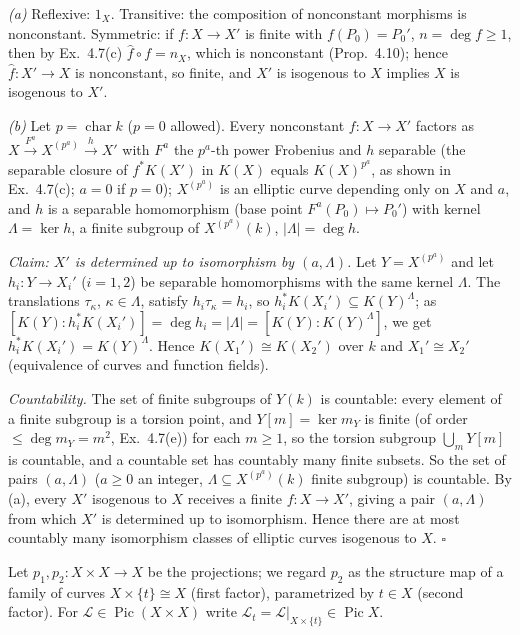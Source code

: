 \documentclass[11pt]{article}
\begin{document}
\emph{(a)} Reflexive: $1_X$. Transitive: the composition of nonconstant morphisms is nonconstant. Symmetric: if $f:X\to X'$ is finite with $f(P_0)=P_0'$, $n=\deg f\ge1$, then by Ex.~4.7(c) $\hat f\circ f=n_X$, which is nonconstant (Prop.~4.10); hence $\hat f:X'\to X$ is nonconstant, so finite, and $X'$ is isogenous to $X$ implies $X$ is isogenous to $X'$.

\emph{(b)} Let $p=\operatorname{char}k$ ($p=0$ allowed). Every nonconstant $f:X\to X'$ factors as $X\xrightarrow{F^a}X^{(p^a)}\xrightarrow{h}X'$ with $F^a$ the $p^a$-th power Frobenius and $h$ separable (the separable closure of $f^*K(X')$ in $K(X)$ equals $K(X)^{p^a}$, as shown in Ex.~4.7(c); $a=0$ if $p=0$); $X^{(p^a)}$ is an elliptic curve depending only on $X$ and $a$, and $h$ is a separable homomorphism (base point $F^a(P_0)\mapsto P_0'$) with kernel $\Lambda=\ker h$, a finite subgroup of $X^{(p^a)}(k)$, $|\Lambda|=\deg h$.

\emph{Claim: $X'$ is determined up to isomorphism by $(a,\Lambda)$.} Let $Y=X^{(p^a)}$ and let $h_i:Y\to X_i'$ ($i=1,2$) be separable homomorphisms with the same kernel $\Lambda$. The translations $\tau_\kappa$, $\kappa\in\Lambda$, satisfy $h_i\tau_\kappa=h_i$, so $h_i^*K(X_i')\subseteq K(Y)^\Lambda$; as $[K(Y):h_i^*K(X_i')]=\deg h_i=|\Lambda|=[K(Y):K(Y)^\Lambda]$, we get $h_i^*K(X_i')=K(Y)^\Lambda$. Hence $K(X_1')\cong K(X_2')$ over $k$ and $X_1'\cong X_2'$ (equivalence of curves and function fields).

\emph{Countability.} The set of finite subgroups of $Y(k)$ is countable: every element of a finite subgroup is a torsion point, and $Y[m]=\ker m_Y$ is finite (of order $\le\deg m_Y=m^2$, Ex.~4.7(e)) for each $m\ge1$, so the torsion subgroup $\bigcup_mY[m]$ is countable, and a countable set has countably many finite subsets. So the set of pairs $(a,\Lambda)$ ($a\ge0$ an integer, $\Lambda\subseteq X^{(p^a)}(k)$ finite subgroup) is countable. By (a), every $X'$ isogenous to $X$ receives a finite $f:X\to X'$, giving a pair $(a,\Lambda)$ from which $X'$ is determined up to isomorphism. Hence there are at most countably many isomorphism classes of elliptic curves isogenous to $X$. \hfill$\square$

\pf
Let $p_1,p_2:X\times X\to X$ be the projections; we regard $p_2$ as the structure map of a family of curves $X\times\{t\}\cong X$ (first factor), parametrized by $t\in X$ (second factor). For $\mathcal L\in\operatorname{Pic}(X\times X)$ write $\mathcal L_t=\mathcal L|_{X\times\{t\}}\in\operatorname{Pic}X$.
\end{document}
